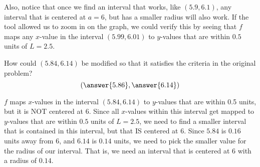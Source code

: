 \documentclass{ximera}
\begin{document}
\begin{exercise}
\begin{question}
\begin{feedback}
 			Also, notice that once we find an interval that works, like $ (5.9, 6.1)$, any interval that is centered at $a=6$, but has a smaller radius will also work.  If the tool allowed us to zoom in on the graph, we could verify this by seeing that $f$ maps any $x$-value in the interval $ (5.99, 6.01) $ to $y$-values that are within $0.5$ units of $L=2.5$.
 		\end{feedback}
 		\begin{question}
 			How could $ (5.84, 6.14) $ be modified so that it satisfies the criteria in the original problem?
			\[
			   \left(\answer{5.86}, \answer{6.14}\right)
			\]
			\begin{feedback}
				$f$ maps $x$-values in the interval $ (5.84, 6.14) $ to $y$-values that are within 0.5 units, but it is NOT centered at $6$.  Since all $x$-values within this interval get mapped to $y$-values that are within $0.5$ units of $L=2.5$, we need to find a smaller interval that is contained in this interval, but that IS centered at $6$.  Since $5.84$ is $0.16$ units away from $6$, and $6.14$ is $0.14$ units, we need to pick the smaller value for the radius of our interval.  That is, we need an interval that is centered at $6$ with a radius of $0.14$.  
			\end{feedback}
 		\end{question}
 	\end{question}
    \end{exercise}
\end{document}
